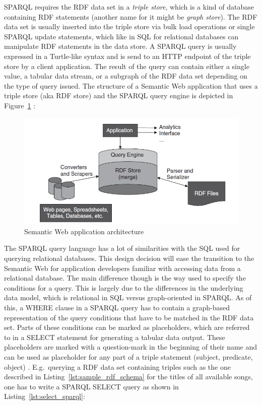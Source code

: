 \gls{SPARQL} requires the \gls{RDF} data set in a \emph{triple store}, which is a kind of database containing \gls{RDF} statements (another name for it might be \emph{graph store}). The \gls{RDF} data set is usually inserted into the triple store via bulk load operations or single \gls{SPARQL} update statements, which like in \gls{SQL} for relational databases can manipulate \gls{RDF} statements in the data store. A \gls{SPARQL} query is usually expressed in a Turtle-like syntax and is send to an \gls{HTTP} endpoint of the triple store by a client application. The result of the query can contain either a single value, a tabular data stream, or a subgraph of the \gls{RDF} data set depending on the type of query issued. The structure of a Semantic Web application that uses a triple store (aka \gls{RDF} store) and the \gls{SPARQL} query engine is depicted in Figure~\ref{fig:images_semweb_app} \citep[pg. 51-60]{allemang2011semantic}:

\begin{figure}[H]
	\centering
	\includegraphics[width=0.9\columnwidth]{images/semantic_web_application.png}
	\caption[Semantic Web application architecture]{Semantic Web application architecture \citep[pg. 57]{allemang2011semantic}}
	\label{fig:images_semweb_app}
\end{figure}

The \gls{SPARQL} query language has a lot of similarities with the \gls{SQL} used for querying relational databases. This design decision will ease the transition to the Semantic Web for application developers familiar with accessing data from a relational database. The main difference though is the way used to specify the conditions for a query. This is largely due to the differences in the underlying data model, which is relational in \gls{SQL} versus graph-oriented in \gls{SPARQL}. As of this, a WHERE clause in a \gls{SPARQL} query has to contain a graph-based representation of the query conditions that have to be matched in the \gls{RDF} data set. Parts of these conditions can be marked as placeholders, which are referred to in a SELECT statement for generating a tabular data output. These placeholders are marked with a question-mark in the beginning of their name and can be used as placeholder for any part of a triple statement (subject, predicate, object) \citep[pg. 66-112]{allemang2011semantic}. E.g.\ querying a \gls{RDF} data set containing triples such as the one described in Listing~\ref{lst:sample_rdf_schema} for the titles of all available songs, one has to write a \gls{SPARQL} SELECT query as shown in Listing~\ref{lst:select_sparql}: \@


